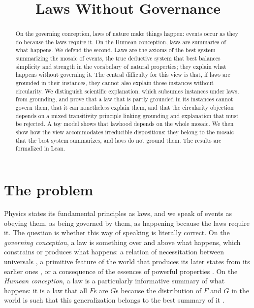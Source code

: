 \documentclass{situationist-preprint}
\title{Laws Without Governance}
\begin{document}
\maketitle

\begin{abstract}
On the governing conception, laws of nature make things happen: events occur as they do because the laws require it. On the Humean conception, laws are summaries of what happens. We defend the second. Laws are the axioms of the best system summarizing the mosaic of events, the true deductive system that best balances simplicity and strength in the vocabulary of natural properties; they explain what happens without governing it. The central difficulty for this view is that, if laws are grounded in their instances, they cannot also explain those instances without circularity. We distinguish scientific explanation, which subsumes instances under laws, from grounding, and prove that a law that is partly grounded in its instances cannot govern them, that it can nonetheless explain them, and that the circularity objection depends on a mixed transitivity principle linking grounding and explanation that must be rejected. A toy model shows that lawhood depends on the whole mosaic. We then show how the view accommodates irreducible dispositions: they belong to the mosaic that the best system summarizes, and laws do not ground them. The results are formalized in Lean.
\end{abstract}

\section{The problem}\label{s:problem}

Physics states its fundamental principles as laws, and we speak of events as obeying them, as being governed by them, as happening because the laws require it. The question is whether this way of speaking is literally correct. On the \emph{governing conception}, a law is something over and above what happens, which constrains or produces what happens: a relation of necessitation between universals \citep{Dretske1977,Tooley1977,Armstrong1983}, a primitive feature of the world that produces its later states from its earlier ones \citep{Maudlin2007}, or a consequence of the essences of powerful properties \citep{Bird2007}. On the \emph{Humean conception}, a law is a particularly informative summary of what happens: it is a law that all $F$s are $G$s because the distribution of $F$ and $G$ in the world is such that this generalization belongs to the best summary of it \citep{Lewis1973Counterfactuals,Lewis1983,Lewis1994}.
\end{document}
